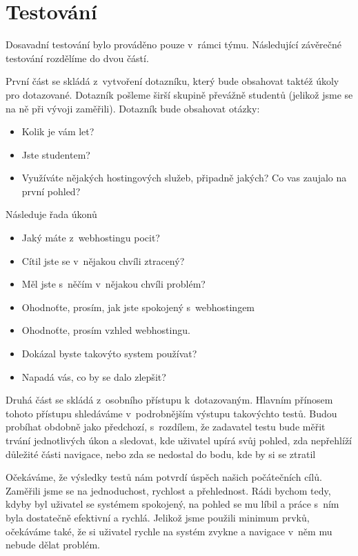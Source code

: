 \documentclass[11pt,a4paper]{article}
\begin{document}
  \section{Testování}

    Dosavadní testování bylo prováděno pouze v~rámci týmu. Následující
    závěrečné testování rozdělíme do dvou částí.

    První část se skládá z~vytvoření dotazníku,
    který bude obsahovat taktéž úkoly pro dotazované. Dotazník pošleme širší
    skupině převážně studentů (jelikož jsme se na ně při vývoji zaměřili).
    Dotazník bude obsahovat otázky:

    \begin{itemize}
      \item Kolik je vám let?
      \item Jste studentem?
      \item Využíváte nějakých hostingových služeb, připadně jakých? Co vas
            zaujalo na první pohled?
    \end{itemize}

    Následuje řada úkonů

    \begin{itemize}
      \item Jaký máte z~webhostingu pocit?
      \item Cítil jste se v~nějakou chvíli ztracený?
      \item Měl jste s~něčím v~nějakou chvíli problém?
      \item Ohodnoťte, prosím, jak jste spokojený s~webhostingem
      \item Ohodnoťte, prosím vzhled webhostingu.
        \item Dokázal byste takovýto system používat?
      \item Napadá vás, co by se dalo zlepšit?
    \end{itemize}

    Druhá část se skládá z~osobního přístupu k~dotazovaným. Hlavním přínosem
    tohoto přístupu shledáváme v~podrobnějším výstupu takovýchto testů.
    Budou probíhat obdobně jako předchozí, s~rozdílem, že zadavatel testu bude
    měřit trvání jednotlivých úkon a sledovat, kde uživatel upírá svůj pohled,
    zda nepřehlíží důležité části navigace, nebo zda se nedostal do bodu, kde
    by si se ztratil

    Očekáváme, že výsledky testů nám potvrdí úspěch našich počátečních cílů.
    Zaměřili jsme se na jednoduchost, rychlost a přehlednost. Rádi bychom
    tedy, kdyby byl uživatel se systémem spokojený, na pohled se mu líbil
    a práce s~ním byla dostatečně efektivní a rychlá.
    Jelikož jsme použili minimum prvků, očekáváme také, že si uživatel rychle
    na systém zvykne a navigace v~něm mu nebude dělat problém.
\end{document}
